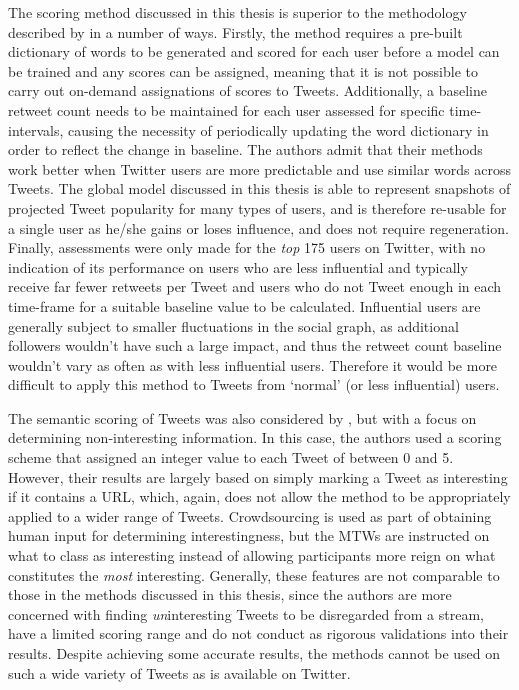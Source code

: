The scoring method discussed in this thesis is superior to the methodology described by \citet{gransee12} in a number of ways. Firstly, the method requires a pre-built dictionary of words to be generated and scored for each user before a model can be trained and any scores can be assigned, meaning that it is not possible to carry out on-demand assignations of scores to Tweets. Additionally, a baseline retweet count needs to be maintained for each user assessed for specific time-intervals, causing the necessity of periodically updating the word dictionary in order to reflect the change in baseline. The authors admit that their methods work better when Twitter users are more predictable and use similar words across Tweets. The global model discussed in this thesis is able to represent snapshots of projected Tweet popularity for many types of users, and is therefore re-usable for a single user as he/she gains or loses influence, and does not require regeneration. Finally, assessments were only made for the \textit{top} 175 users on Twitter, with no indication of its performance on users who are less influential and typically receive far fewer retweets per Tweet and users who do not Tweet enough in each time-frame for a suitable baseline value to be calculated. Influential users are generally subject to smaller fluctuations in the social graph, as additional followers wouldn't have such a large impact, and thus the retweet count baseline wouldn't vary as often as with less influential users. Therefore it would be more difficult to apply this method to Tweets from `normal' (or less influential) users.


The semantic scoring of Tweets was also considered by \citet{alonso10}, but with a focus on determining non-interesting information. In this case, the authors used a scoring scheme that assigned an integer value to each Tweet of between 0 and 5. However, their results are largely based on simply marking a Tweet as interesting if it contains a URL, which, again, does not allow the method to be appropriately applied to a wider range of Tweets. Crowdsourcing is used as part of obtaining human input for determining interestingness, but the MTWs are instructed on what to class as interesting instead of allowing participants more reign on what constitutes the \textit{most} interesting. Generally, these features are not comparable to those in the methods discussed in this thesis, since the authors are more concerned with finding \textit{un}interesting Tweets to be disregarded from a stream, have a limited scoring range and do not conduct as rigorous validations into their results. Despite achieving some accurate results, the methods cannot be used on such a wide variety of Tweets as is available on Twitter.

